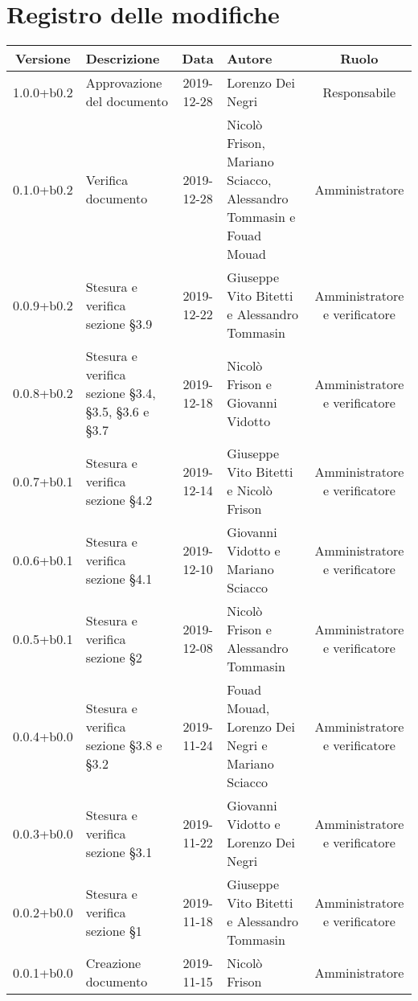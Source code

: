\section*{Registro delle modifiche}

\begin{center}
	\begin{longtable}{|c|p{3cm}|c|p{4cm}|c|}
	\hline
	\rowcolor{lighter-grayer}
	\textbf{Versione} & \textbf{Descrizione} & \textbf{Data} & \textbf{Autore} & \textbf{Ruolo} \\
	\hline
	\endfirsthead



	\hline
	1.0.0+b0.2 & Approvazione del documento & 2019-12-28 & Lorenzo Dei Negri & Responsabile \\
	\hline
	0.1.0+b0.2 & Verifica documento & 2019-12-28 & Nicolò Frison, Mariano Sciacco, Alessandro Tommasin e Fouad Mouad & Amministratore \\
	\hline 
	0.0.9+b0.2 & Stesura e verifica sezione \S3.9 & 2019-12-22 & Giuseppe Vito Bitetti e Alessandro Tommasin  & Amministratore e verificatore \\
	\hline
	0.0.8+b0.2 & Stesura e verifica sezione \S3.4, \S3.5, \S3.6 e \S3.7 & 2019-12-18 & Nicolò Frison e Giovanni Vidotto & Amministratore e verificatore \\
	\hline
	0.0.7+b0.1 & Stesura e verifica sezione \S4.2 & 2019-12-14 & Giuseppe Vito Bitetti e Nicolò Frison & Amministratore e verificatore \\
	\hline
	0.0.6+b0.1 & Stesura e verifica sezione \S4.1 & 2019-12-10 & Giovanni Vidotto e Mariano Sciacco & Amministratore e verificatore \\
	\hline
	0.0.5+b0.1 & Stesura e verifica sezione \S2  & 2019-12-08 & Nicolò Frison e Alessandro Tommasin & Amministratore e verificatore \\
	\hline
	0.0.4+b0.0 & Stesura e verifica sezione \S3.8 e \S3.2 & 2019-11-24 & Fouad Mouad, Lorenzo Dei Negri e Mariano Sciacco & Amministratore e verificatore \\
	\hline
	0.0.3+b0.0 & Stesura e verifica sezione \S3.1 & 2019-11-22 & Giovanni Vidotto e Lorenzo Dei Negri & Amministratore e verificatore \\
	\hline
	0.0.2+b0.0 & Stesura e verifica sezione \S1 & 2019-11-18 & Giuseppe Vito Bitetti e Alessandro Tommasin & Amministratore e verificatore \\
	\hline
	0.0.1+b0.0 & Creazione documento & 2019-11-15 & Nicolò Frison & Amministratore  \\
	\hline

	\end{longtable}
\end{center}
